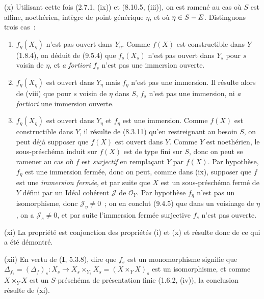 (x) Utilisant cette fois (2.7.1, (ix)) et (8.10.5, (iii)), on est ramené au cas
où $S$ est affine, noethérien, intègre de point générique $\eta$, et où
$\eta\in S- E$. Distinguons trois cas~:

\begin{enumerate}[label=\upshape{$\arabic{enumi}^\circ$}]
  \item $f_\eta(X_\eta)$ n'est pas ouvert dans $Y_\eta$. Comme $f(X)$ est
  constructible dans $Y$ (1.8.4), on déduit de (9.5.4) que $f_s(X_s)$ n'est
  pas ouvert dans $Y_s$ pour $s$ voisin de $\eta$, et \emph{a fortiori} $f_s$
  n'est pas une immersion ouverte.

  \item $f_\eta(X_\eta)$ est ouvert dans $Y_\eta$ mais $f_\eta$ n'est pas une
  immersion. Il résulte alors de (viii) que pour $s$ voisin de $\eta$ dans $S$,
  $f_s$ n'est pas une immersion, ni \emph{a fortiori} une immersion ouverte.

  \item $f_\eta(X_\eta)$ est ouvert dans $Y_\eta$ et $f_\eta$ est une
  immersion. Comme $f(X)$ est constructible dans $Y$, il résulte de (8.3.11)
  qu'en restreignant au besoin $S$, on peut déjà supposer que $f(X)$ est ouvert
  dans $Y$. Comme $Y$ est noethérien, le sous-préschéma induit sur $f(X)$ est
  de type fini sur $S$, donc on peut se ramener au cas où $f$ est \emph{surjectif}
  en remplaçant $Y$ par $f(X)$. Par hypothèse, $f_\eta$ est une immersion
  fermée, donc on peut, comme dans (ix), supposer que $f$ est une \emph{immersion
  fermée}, et par suite que $X$ est un sous-préschéma fermé de $Y$ défini
  par un Idéal cohérent $\mathcal J$ de $\mathcal O_Y$. Par hypothèse
  $f_\eta$ n'est pas un isomorphisme, donc $\mathcal J_\eta\neq0$~; on en
  conclut (9.4.5) que dans un voisinage de $\eta$, on a $\mathcal J_s\neq0$,
  et par suite l'immersion fermée surjective $f_s$ n'est pas ouverte.
\end{enumerate}

(xi) La propriété est conjonction des propriétés (i) et (x) et résulte donc de
ce qui a été démontré.

(xii) En vertu de (\textbf{I}, 5.3.8), dire que $f_s$ est un monomorphisme
signifie que
$\Delta_{f_s}=(\Delta_f)_s:X_s\to X_s\times_{Y_s}X_s=(X\times_YX)_s$ est un
isomorphisme, et comme $X\times_YX$ est un $S$-préschéma de présentation finie
(1.6.2, (iv)), la conclusion résulte de (xi).

